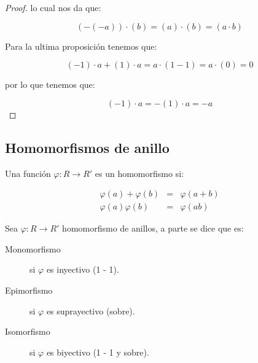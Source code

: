 \begin{proof}
            lo cual nos da que:

            \begin{equation*}
                (-(-a)) \cdot (b) = (a) \cdot (b) = (a \cdot b)
            \end{equation*}

            Para la ultima proposición tenemos que:

            \begin{equation*}
                (-1) \cdot a + (1) \cdot a = a \cdot (1 - 1) = a \cdot (0) = 0 
            \end{equation*}

            por lo que tenemos que:

            \begin{equation*}
                (-1) \cdot a = -(1) \cdot a = -a
            \end{equation*}
        \end{proof}



    \subsection{Homomorfismos de anillo}

        \begin{definicion}
            Una función $\varphi \colon R \to R'$ es un homomorfismo si:

            \begin{eqnarray}
                \varphi(a) + \varphi(b) & = & \varphi(a + b) \\
                \varphi(a) \varphi(b) & = & \varphi(ab)
            \end{eqnarray}
        \end{definicion}

        \begin{definicion}
            Sea $\varphi \colon R \to R'$ homomorfismo de anillos, a parte se dice que es:

            \begin{description}
                \item[Monomorfismo] si $\varphi$ es inyectivo (1 - 1).
                \item[Epimorfismo] si $\varphi$ es suprayectivo (sobre).
                \item[Isomorfismo] si $\varphi$ es biyectivo (1 - 1 y sobre).
            \end{description}
        \end{definicion}

